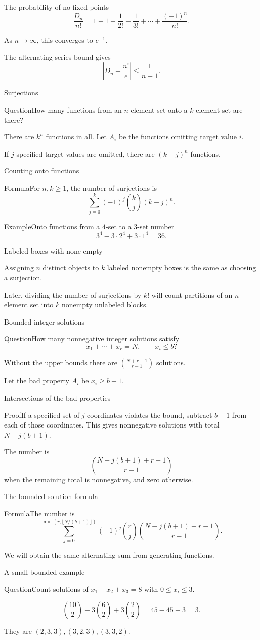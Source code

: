\documentclass[aspectratio=169,11pt]{beamer}
\newcommand{\Thm}[2]{\begin{block}{#1}#2\end{block}}
\renewcommand{\Proof}[1]{\begin{block}{Proof}\normalsize #1\end{block}}
\newcommand{\Question}[1]{\begin{block}{Question}#1\end{block}}
\renewcommand{\Example}[1]{\begin{block}{Example}#1\end{block}}
\newcommand{\gap}{\par\medskip}
\begin{document}
\begin{frame}{The probability of no fixed points}
\large
\[\frac{D_n}{n!}=1-1+\frac1{2!}-\frac1{3!}+\cdots+\frac{(-1)^n}{n!}.\]
\gap As $n\to\infty$, this converges to $e^{-1}$.
\gap The alternating-series bound gives
\[\left|D_n-\frac{n!}{e}\right|\leq\frac1{n+1}.\]
\end{frame}
\begin{frame}{Surjections}
\large
\Question{How many functions from an $n$-element set onto a $k$-element set are there?}
\gap There are $k^n$ functions in all. Let $A_i$ be the functions omitting target value $i$.
\gap If $j$ specified target values are omitted, there are $(k-j)^n$ functions.
\end{frame}
\begin{frame}{Counting onto functions}
\large
\Thm{Formula}{For $n,k\geq1$, the number of surjections is
\[\sum_{j=0}^k(-1)^j\binom kj(k-j)^n.\]}
\Example{Onto functions from a $4$-set to a $3$-set number
\[3^4-3\cdot2^4+3\cdot1^4=36.\]}
\end{frame}
\begin{frame}{Labeled boxes with none empty}
\large
\gap Assigning $n$ distinct objects to $k$ labeled nonempty boxes is the same as choosing a surjection.
\gap Later, dividing the number of surjections by $k!$ will count partitions of an $n$-element set into $k$ nonempty unlabeled blocks.
\end{frame}
\begin{frame}{Bounded integer solutions}
\large
\Question{How many nonnegative integer solutions satisfy
\[x_1+\cdots+x_r=N,\qquad x_i\leq b?\]}
\gap Without the upper bounds there are $\binom{N+r-1}{r-1}$ solutions.
\gap Let the bad property $A_i$ be $x_i\geq b+1$.
\end{frame}
\begin{frame}{Intersections of the bad properties}
\large
\Proof{If a specified set of $j$ coordinates violates the bound, subtract $b+1$ from each of those coordinates. This gives nonnegative solutions with total $N-j(b+1)$.\gap The number is
\[\binom{N-j(b+1)+r-1}{r-1}\]
when the remaining total is nonnegative, and zero otherwise.}
\end{frame}
\begin{frame}{The bounded-solution formula}
\large
\Thm{Formula}{The number is
\[\sum_{j=0}^{\min(r,\lfloor N/(b+1)\rfloor)}
(-1)^j\binom rj\binom{N-j(b+1)+r-1}{r-1}.\]}
\gap We will obtain the same alternating sum from generating functions.
\end{frame}
\begin{frame}{A small bounded example}
\large
\Question{Count solutions of $x_1+x_2+x_3=8$ with $0\leq x_i\leq3$.}
\[\binom{10}2-3\binom62+3\binom22=45-45+3=3.\]
\gap They are $(2,3,3),(3,2,3),(3,3,2)$.
\end{frame}
\end{document}
